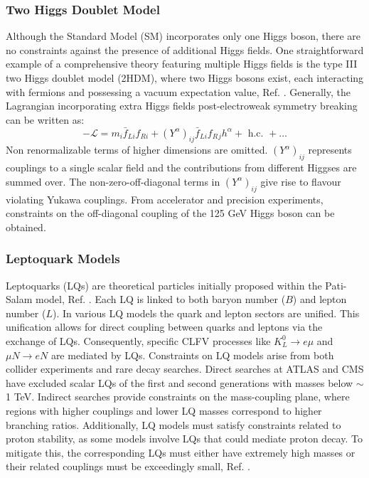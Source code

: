 \subsubsection{Two Higgs Doublet Model}\label{2higgs}
Although the Standard Model (SM) incorporates only one Higgs boson, there are no constraints against the presence of additional Higgs fields. One straightforward example of a comprehensive theory featuring multiple Higgs fields is the type III two Higgs doublet model (2HDM), where two Higgs bosons exist, each interacting with fermions and possessing a vacuum expectation value, Ref. \cite{Harnik_2013}. Generally, the Lagrangian incorporating extra Higgs fields post-electroweak symmetry breaking can be written as:
\begin{equation}
-\mathscr{L}=m_i \bar{f}_{L i} f_{R i}+\left(Y^\alpha\right)_{i j} \bar{f}_{L i} f_R{ }_j h^\alpha+\text { h.c. }+\ldots
\end{equation}
Non renormalizable terms of higher dimensions are omitted. $(Y^\alpha)_{i j}$ represents couplings to a single scalar field and the contributions from different Higgses are summed over. The non-zero-off-diagonal terms in $(Y^\alpha)_{i j}$ give rise to flavour violating Yukawa couplings. From accelerator and precision experiments, constraints on the off-diagonal coupling of the 125 GeV Higgs boson can be obtained.
\subsubsection{Leptoquark Models}
Leptoquarks (LQs) are theoretical particles initially proposed within the Pati-Salam model, Ref. \cite{PhysRevD.10.275}. Each LQ is linked to both baryon number ($B$) and lepton number ($L$). In various LQ models the quark and lepton sectors are unified. This unification allows for direct coupling between quarks and leptons via the exchange of LQs. Consequently, specific CLFV processes like $K_L^0 \rightarrow e \mu$ and $\mu N \rightarrow e N$ are mediated by LQs. Constraints on LQ models arise from both collider experiments and rare decay searches. Direct searches at ATLAS and CMS have excluded scalar LQs of the first and second generations with masses below $\sim$1 TeV. Indirect searches provide constraints on the mass-coupling plane, where regions with higher couplings and lower LQ masses correspond to higher branching ratios. Additionally, LQ models must satisfy constraints related to proton stability, as some models involve LQs that could mediate proton decay. To mitigate this, the corresponding LQs must either have extremely high masses or their related couplings must be exceedingly small, Ref. \cite{DORSNER20161}.
